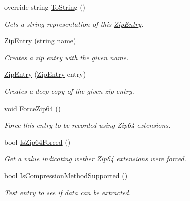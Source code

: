 \begin{DoxyCompactItemize}
override string \hyperlink{class_i_c_sharp_code_1_1_sharp_zip_lib_1_1_zip_1_1_zip_entry_a0cd045443176515f91c959537d8c8b51}{To\+String} ()
\begin{DoxyCompactList}\small\item\em Gets a string representation of this \hyperlink{class_i_c_sharp_code_1_1_sharp_zip_lib_1_1_zip_1_1_zip_entry}{Zip\+Entry}. \end{DoxyCompactList}\item 
\hyperlink{class_i_c_sharp_code_1_1_sharp_zip_lib_1_1_zip_1_1_zip_entry_a0964e8db6ee84b427a99c5439c37104a}{Zip\+Entry} (string name)
\begin{DoxyCompactList}\small\item\em Creates a zip entry with the given name. \end{DoxyCompactList}\item 
\hyperlink{class_i_c_sharp_code_1_1_sharp_zip_lib_1_1_zip_1_1_zip_entry_a6bbb789c245e55161cbfb08d0754b126}{Zip\+Entry} (\hyperlink{class_i_c_sharp_code_1_1_sharp_zip_lib_1_1_zip_1_1_zip_entry}{Zip\+Entry} entry)
\begin{DoxyCompactList}\small\item\em Creates a deep copy of the given zip entry. \end{DoxyCompactList}\item 
void \hyperlink{class_i_c_sharp_code_1_1_sharp_zip_lib_1_1_zip_1_1_zip_entry_a4cc13a9e0dc8a7176eeff410dc462c86}{Force\+Zip64} ()
\begin{DoxyCompactList}\small\item\em Force this entry to be recorded using Zip64 extensions. \end{DoxyCompactList}\item 
bool \hyperlink{class_i_c_sharp_code_1_1_sharp_zip_lib_1_1_zip_1_1_zip_entry_a1dac769cb20f363a6d1c53c0dade36d9}{Is\+Zip64\+Forced} ()
\begin{DoxyCompactList}\small\item\em Get a value indicating wether Zip64 extensions were forced. \end{DoxyCompactList}\item 
bool \hyperlink{class_i_c_sharp_code_1_1_sharp_zip_lib_1_1_zip_1_1_zip_entry_a472828fa6521baf1ae8515b7b6753d16}{Is\+Compression\+Method\+Supported} ()
\begin{DoxyCompactList}\small\item\em Test entry to see if data can be extracted. \end{DoxyCompactList}\item 

\end{DoxyCompactItemize}
